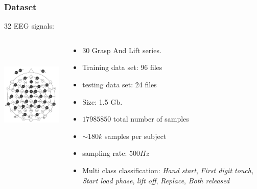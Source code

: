 \documentclass{beamer}
\begin{document}
\begin{frame}
\frametitle{Dataset}
32 EEG signals:
\begin{columns}[T]
\begin{column}{.5\textwidth}
\begin{center}
\includegraphics[height=2.0in]{EEG_Electrode_Numbering.jpg}
\end{center}
\end{column}
\begin{column}{.5\textwidth}
\begin{itemize} 
\item 30 Grasp And Lift series.
\item Training data set: 96 files
\item testing data set: 24 files
\item  Size: 1.5 Gb.
\item $17985850$ total number of samples
\item $\sim180k$ samples per subject
\item sampling rate: $ 500Hz$
\item Multi class classification: \textit{Hand start}, \textit{First digit touch}, \textit{Start load phase}, \textit{lift off}, \textit{Replace}, \textit{Both released}
\end{itemize}
\end{column}
\end{columns}
\end{frame}
\end{document}
